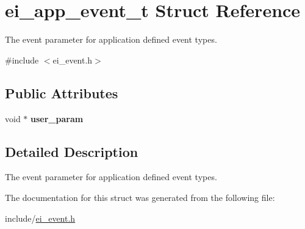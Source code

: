 \hypertarget{structei__app__event__t}{}\section{ei\+\_\+app\+\_\+event\+\_\+t Struct Reference}
\label{structei__app__event__t}


The event parameter for application defined event types.  




{\ttfamily \#include $<$ei\+\_\+event.\+h$>$}

\subsection*{Public Attributes}
\begin{DoxyCompactItemize}
\item 
void $\ast$ {\bfseries user\+\_\+param}\hypertarget{structei__app__event__t_a236a89c3726aa9c770da42ba37ce3d3f}{}\label{structei__app__event__t_a236a89c3726aa9c770da42ba37ce3d3f}

\end{DoxyCompactItemize}


\subsection{Detailed Description}
The event parameter for application defined event types. 

The documentation for this struct was generated from the following file\+:\begin{DoxyCompactItemize}
\item 
include/\hyperlink{ei__event_8h}{ei\+\_\+event.\+h}\end{DoxyCompactItemize}
